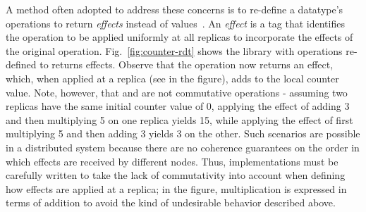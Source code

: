 A method often adopted to address these concerns is to re-define a
datatype's operations to return \emph{effects} instead of
values~\cite{SPB+11,Burckhardt2014}.  An \emph{effect} is a tag that
identifies the operation to be applied uniformly at all replicas to
incorporate the effects of the original
operation. Fig.~\ref{fig:counter-rdt} shows the  library
with operations re-defined to returns effects.  Observe that the
 operation now returns an  effect, which,
when applied at a replica (see  in the figure), adds  to
the local counter value.  Note, however, that  and  are
not commutative operations - assuming two replicas have the same
initial counter value of 0, applying the effect of adding 3 and then
multiplying 5 on one replica yields 15, while applying the effect of
first multiplying 5 and then adding 3 yields 3 on the other.  Such
scenarios are possible in a distributed system because there are no
coherence guarantees on the order in which effects are received by
different nodes.  Thus, implementations must be carefully written to
take the lack of commutativity into account when defining how effects
are applied at a replica; in the figure, multiplication is expressed
in terms of addition to avoid the kind of undesirable behavior
described above.

